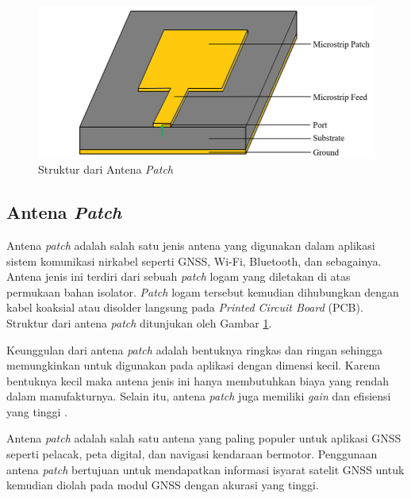 \begin{figure}[ht]
	\centering
	\includegraphics[width=12cm]{contents/chapter-2/patch-antena.jpg}
	\caption{Struktur dari Antena \textit{Patch} \cite{Chowdhury2019}}
	\label{Fig: patch-antenna}
\end{figure}

\subsection{Antena \textit{Patch}}
Antena \textit{patch} adalah salah satu jenis antena yang digunakan dalam aplikasi sistem komunikasi nirkabel seperti GNSS, Wi-Fi, Bluetooth, dan sebagainya. Antena jenis ini terdiri dari sebuah \textit{patch} logam yang diletakan di atas permukaan bahan isolator. \textit{Patch} logam tersebut kemudian dihubungkan dengan kabel koaksial atau disolder langsung pada \textit{Printed Circuit Board} (PCB). Struktur dari antena \textit{patch} ditunjukan oleh Gambar \ref{Fig: patch-antenna}.

Keunggulan dari antena \textit{patch} adalah bentuknya ringkas dan ringan sehingga memungkinkan untuk digunakan pada aplikasi dengan dimensi kecil. Karena bentuknya kecil maka antena jenis ini hanya membutuhkan biaya yang rendah dalam manufakturnya. Selain itu, antena \textit{patch} juga memiliki \textit{gain} dan efisiensi yang tinggi \cite{Ding2020}.

Antena \textit{patch} adalah salah satu antena yang paling populer untuk aplikasi GNSS seperti pelacak, peta digital, dan navigasi kendaraan bermotor. Penggunaan antena \textit{patch} bertujuan untuk mendapatkan informasi isyarat satelit GNSS untuk kemudian diolah pada modul GNSS dengan akurasi yang tinggi.


